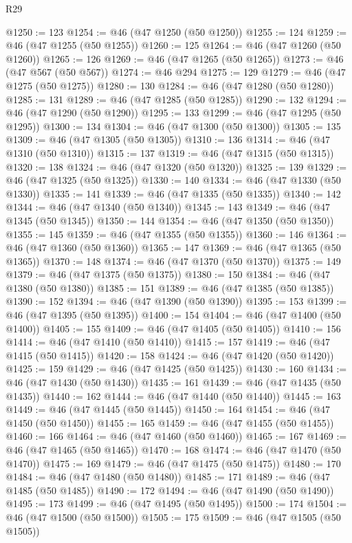 \begin{lexlean}{R29}
\begin{coremodule}
@1250 := 123
@1254 := @46 (@47 @1250 (@50 @1250))
@1255 := 124
@1259 := @46 (@47 @1255 (@50 @1255))
@1260 := 125
@1264 := @46 (@47 @1260 (@50 @1260))
@1265 := 126
@1269 := @46 (@47 @1265 (@50 @1265))
@1273 := @46 (@47 @567 (@50 @567))
@1274 := @46 @294
@1275 := 129
@1279 := @46 (@47 @1275 (@50 @1275))
@1280 := 130
@1284 := @46 (@47 @1280 (@50 @1280))
@1285 := 131
@1289 := @46 (@47 @1285 (@50 @1285))
@1290 := 132
@1294 := @46 (@47 @1290 (@50 @1290))
@1295 := 133
@1299 := @46 (@47 @1295 (@50 @1295))
@1300 := 134
@1304 := @46 (@47 @1300 (@50 @1300))
@1305 := 135
@1309 := @46 (@47 @1305 (@50 @1305))
@1310 := 136
@1314 := @46 (@47 @1310 (@50 @1310))
@1315 := 137
@1319 := @46 (@47 @1315 (@50 @1315))
@1320 := 138
@1324 := @46 (@47 @1320 (@50 @1320))
@1325 := 139
@1329 := @46 (@47 @1325 (@50 @1325))
@1330 := 140
@1334 := @46 (@47 @1330 (@50 @1330))
@1335 := 141
@1339 := @46 (@47 @1335 (@50 @1335))
@1340 := 142
@1344 := @46 (@47 @1340 (@50 @1340))
@1345 := 143
@1349 := @46 (@47 @1345 (@50 @1345))
@1350 := 144
@1354 := @46 (@47 @1350 (@50 @1350))
@1355 := 145
@1359 := @46 (@47 @1355 (@50 @1355))
@1360 := 146
@1364 := @46 (@47 @1360 (@50 @1360))
@1365 := 147
@1369 := @46 (@47 @1365 (@50 @1365))
@1370 := 148
@1374 := @46 (@47 @1370 (@50 @1370))
@1375 := 149
@1379 := @46 (@47 @1375 (@50 @1375))
@1380 := 150
@1384 := @46 (@47 @1380 (@50 @1380))
@1385 := 151
@1389 := @46 (@47 @1385 (@50 @1385))
@1390 := 152
@1394 := @46 (@47 @1390 (@50 @1390))
@1395 := 153
@1399 := @46 (@47 @1395 (@50 @1395))
@1400 := 154
@1404 := @46 (@47 @1400 (@50 @1400))
@1405 := 155
@1409 := @46 (@47 @1405 (@50 @1405))
@1410 := 156
@1414 := @46 (@47 @1410 (@50 @1410))
@1415 := 157
@1419 := @46 (@47 @1415 (@50 @1415))
@1420 := 158
@1424 := @46 (@47 @1420 (@50 @1420))
@1425 := 159
@1429 := @46 (@47 @1425 (@50 @1425))
@1430 := 160
@1434 := @46 (@47 @1430 (@50 @1430))
@1435 := 161
@1439 := @46 (@47 @1435 (@50 @1435))
@1440 := 162
@1444 := @46 (@47 @1440 (@50 @1440))
@1445 := 163
@1449 := @46 (@47 @1445 (@50 @1445))
@1450 := 164
@1454 := @46 (@47 @1450 (@50 @1450))
@1455 := 165
@1459 := @46 (@47 @1455 (@50 @1455))
@1460 := 166
@1464 := @46 (@47 @1460 (@50 @1460))
@1465 := 167
@1469 := @46 (@47 @1465 (@50 @1465))
@1470 := 168
@1474 := @46 (@47 @1470 (@50 @1470))
@1475 := 169
@1479 := @46 (@47 @1475 (@50 @1475))
@1480 := 170
@1484 := @46 (@47 @1480 (@50 @1480))
@1485 := 171
@1489 := @46 (@47 @1485 (@50 @1485))
@1490 := 172
@1494 := @46 (@47 @1490 (@50 @1490))
@1495 := 173
@1499 := @46 (@47 @1495 (@50 @1495))
@1500 := 174
@1504 := @46 (@47 @1500 (@50 @1500))
@1505 := 175
@1509 := @46 (@47 @1505 (@50 @1505))

\end{coremodule}
\end{lexlean}
